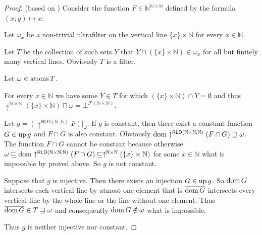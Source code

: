 \begin{proof}
(based on \cite{MO44055}) Consider the function $F\in\mathbb{N}^{\mathbb{N}\times\mathbb{N}}$
defined by the formula $(x;y)\mapsto x$.

Let $\omega_{x}$ be a non-trivial ultrafilter on the vertical line
$\{x\}\times\mathbb{N}$ for every $x\in\mathbb{N}$.

Let $T$ be the collection of such sets $Y$ that $Y\cap(\{x\}\times\mathbb{N})\in\omega_{x}$
for all but finitely many vertical lines. Obviously $T$ is a filter.

Let $\omega\in\operatorname{atoms} T$.

For every $x\in\mathbb{N}$ we have some $Y\in T$ for which $(\{x\}\times\mathbb{N})\cap Y=\emptyset$
and thus $\uparrow^{\mathbb{N}\times\mathbb{N}}(\{x\}\times\mathbb{N})\sqcap\omega=\bot^{\mathscr{F}(\mathbb{N}\times\mathbb{N})}$.

Let $g=(\uparrow^{\mathsf{RLD}(\mathbb{N};\mathbb{N})}F)|_{\omega}$.
If $g$ is constant, then there exist a constant function $G\in\operatorname{up} g$
and $F\cap G$ is also constant. Obviously $\operatorname{dom}\uparrow^{\mathsf{RLD}(\mathbb{N}\times\mathbb{N};\mathbb{N})}(F\cap G)\sqsupseteq\omega$.
The function $F\cap G$ cannot be constant because otherwise $\omega\sqsubseteq\operatorname{dom}\uparrow^{\mathsf{RLD}(\mathbb{N}\times\mathbb{N};\mathbb{N})}(F\cap G)\sqsubseteq\uparrow^{\mathbb{N}\times\mathbb{N}}(\{x\}\times\mathbb{N})$
for some $x\in\mathbb{N}$ what is impossible by proved above. So
$g$ is not constant.

Suppose that $g$ is injective. Then there exists an injection $G\in\operatorname{up} g$.
So $\operatorname{dom} G$ intersects each vertical line by atmost one element that
is $\overline{\operatorname{dom} G}$ intersects every vertical line by the whole
line or the line without one element. Thus $\overline{\operatorname{dom} G}\in T\sqsupseteq\omega$
and consequently $\operatorname{dom} G\notin\omega$ what is impossible.

Thus $g$ is neither injective nor constant.
\end{proof}


